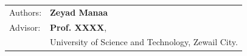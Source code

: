\begin{titlepage}
\vspace{0.2cm}
\begin{table}[h!]
    \begin{tabular}{p{}p{}}
        Authors: & \textbf{Zeyad Manaa} \\
        Advisor: & \textbf{Prof. XXXX}, \\
                & University of Science and Technology, Zewail City.
    \end{tabular}
\end{table}


\end{titlepage}

